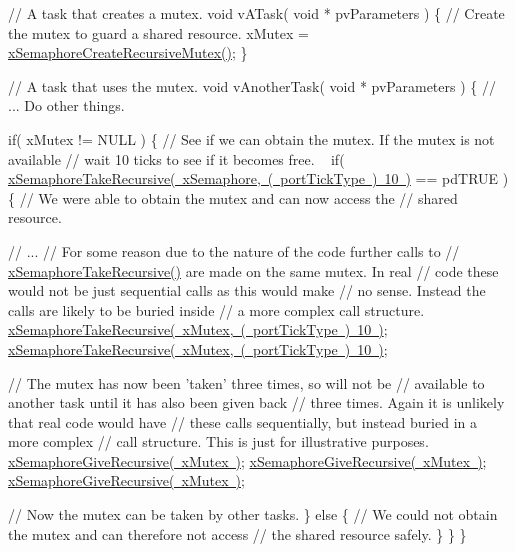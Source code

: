 \begin{DoxyPre}// A task that creates a mutex.
void vATask( void * pvParameters )
\{
   // Create the mutex to guard a shared resource.
   xMutex = \mbox{\hyperlink{semphr_8h_a1bbc843be5a41ea83d2693b2189fc0f8}{xSemaphoreCreateRecursiveMutex()}};
\}\end{DoxyPre}



\begin{DoxyPre}// A task that uses the mutex.
void vAnotherTask( void * pvParameters )
\{
   // ... Do other things.\end{DoxyPre}



\begin{DoxyPre}   if( xMutex != NULL )
   \{
       // See if we can obtain the mutex.  If the mutex is not available
       // wait 10 ticks to see if it becomes free.  
~\newline
       if( \mbox{\hyperlink{semphr_8h_ad395f4bba51eea6af3397d72bc079e4d}{xSemaphoreTakeRecursive( xSemaphore, ( portTickType ) 10 )}} == pdTRUE )
       \{
           // We were able to obtain the mutex and can now access the
           // shared resource.\end{DoxyPre}



\begin{DoxyPre}           // ...
           // For some reason due to the nature of the code further calls to 
        // \mbox{\hyperlink{semphr_8h_ad395f4bba51eea6af3397d72bc079e4d}{xSemaphoreTakeRecursive()}} are made on the same mutex.  In real
        // code these would not be just sequential calls as this would make
        // no sense.  Instead the calls are likely to be buried inside
        // a more complex call structure.
           \mbox{\hyperlink{semphr_8h_ad395f4bba51eea6af3397d72bc079e4d}{xSemaphoreTakeRecursive( xMutex, ( portTickType ) 10 )}};
           \mbox{\hyperlink{semphr_8h_ad395f4bba51eea6af3397d72bc079e4d}{xSemaphoreTakeRecursive( xMutex, ( portTickType ) 10 )}};\end{DoxyPre}



\begin{DoxyPre}           // The mutex has now been 'taken' three times, so will not be 
        // available to another task until it has also been given back
        // three times.  Again it is unlikely that real code would have
        // these calls sequentially, but instead buried in a more complex
        // call structure.  This is just for illustrative purposes.
           \mbox{\hyperlink{semphr_8h_a398d66b17856c22dd49d39aaac42f105}{xSemaphoreGiveRecursive( xMutex )}};
        \mbox{\hyperlink{semphr_8h_a398d66b17856c22dd49d39aaac42f105}{xSemaphoreGiveRecursive( xMutex )}};
        \mbox{\hyperlink{semphr_8h_a398d66b17856c22dd49d39aaac42f105}{xSemaphoreGiveRecursive( xMutex )}};\end{DoxyPre}



\begin{DoxyPre}        // Now the mutex can be taken by other tasks.
       \}
       else
       \{
           // We could not obtain the mutex and can therefore not access
           // the shared resource safely.
       \}
   \}
\}
\end{DoxyPre}
 